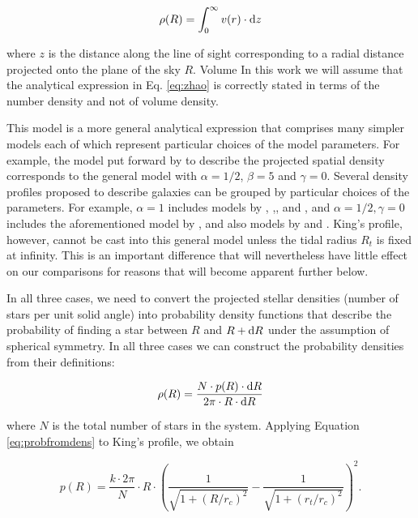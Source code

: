 \begin{equation}
  \rho(R) = \int_{0}^{\infty}v(r)\cdot {\rm d}z  
\end{equation}

where $z$ is the distance along the line of sight corresponding to a radial distance projected onto the plane of the sky $R$.
{Volume}
In this work we will assume that the analytical expression in Eq. \ref{eq:zhao} is correctly stated in terms of the number density and not of volume density.

This model is a more general analytical expression that comprises many simpler models each of which represent particular choices of the model parameters. For example, the model put forward by \cite{1911MNRAS..71..460P} to describe the projected spatial density corresponds to the general model with $\alpha=1/2$, $\beta=5$ and $\gamma=0$. Several density profiles proposed to describe galaxies can be grouped by particular choices of the parameters. For example, $\alpha=1$ includes models by \cite{1997ApJ...490..493N}, \cite{1990ApJ...356..359H},\cite{1983MNRAS.202..995J}, and \cite{1999MNRAS.310.1147M}, and $\alpha=1/2, \gamma=0$ includes the aforementioned model by \cite{1911MNRAS..71..460P}, and also models by \cite{1990ApJ...361..408S} and \cite{1985MNRAS.216..273D}. King's profile, however, cannot be cast into this general model unless the tidal radius $R_t$ is fixed at infinity. This is an important difference that will nevertheless have little effect on our comparisons for reasons that will become apparent further below.

In all three cases, we need to convert the projected stellar densities (number of stars per unit solid angle) into probability density functions that describe the probability of finding a star between $R$ and $R+{\rm d}R$ under the assumption of spherical symmetry. In all three cases we can construct the probability densities from their definitions:

\begin{equation}
\rho(R)=\frac{N\cdot p(R)\cdot {\rm d}R}{2\pi\cdot R\cdot {\rm d}R}
\label{eq:probfromdens}
\end{equation}

where $N$ is the total number of stars in the system. Applying Equation \ref{eq:probfromdens} to King's profile, we obtain

\begin{equation}
  p(R)=\frac{k\cdot2\pi}{N}\cdot R \cdot
  \left(\frac{1}{\sqrt{1+(R/r_c)^2}} - \frac{1}{\sqrt{1+(r_t/r_c)^2}}\right)^2.
\end{equation}

